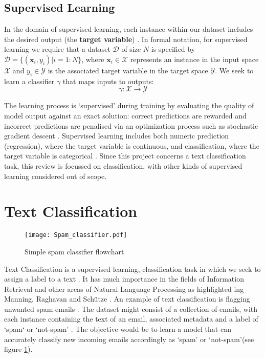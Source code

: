 \documentclass[Dissertation.tex]{subfiles}
\begin{document}
\subsection{Supervised Learning}
In the domain of supervised learning, each instance within our dataset includes the desired output (the \textbf{target variable}) \cite{geronHandsonMachineLearning2017}. In formal notation, for supervised learning we require that a dataset $ \mathcal{D}$ of size $N$ is specified by $ \mathcal{D} = \{(\mathbf{x}_i, y_i) | i = 1:N\}$, where $ \mathbf{x}_i \in \mathcal{X} $ represents an instance in the input space $ \mathcal{X} $ and $ y_i \in \mathcal{Y}$ is the associated target variable in the target space $ \mathcal{Y} $. We seek to learn a classifier $ \gamma $ that maps inputs to outputs:
$$ \gamma: \mathcal{X}\rightarrow\mathcal{Y}$$ 

The learning process is `supervised' during training by evaluating the quality of model output against an exact solution: correct predictions are rewarded and incorrect predictions are penalised via an optimization process such as stochastic gradient descent \cite{mendelsonAdvancedLecturesMachine2003}. Supervised learning includes both numeric prediction (regression), where the target variable is continuous, and classification, where the target variable is categorical \cite{wittenDataMiningPractical2011}. Since this project concerns a text classification task, this review is focussed on classification, with other kinds of supervised learning considered out of scope. 

\section{Text Classification}


\begin{figure}

	\centering
	\texttt{[image: Spam\_classifier.pdf]}
	\caption{Simple spam classifier flowchart}
	\label{spamClassifier}
\end{figure}
Text Classification is a supervised learning, classification task in which we seek to assign a label to a text \cite{jurafskySpeechLanguageProcessing}. It has much importance in the fields of Information Retrieval and other areas of Natural Language Processing  as highlighted ing Manning, Raghavan and Sch\"{u}tze \cite{manningIntroductionInformationRetrieval2009}.
An example of text classification is flagging unwanted spam emails \cite{geronHandsonMachineLearning2017}. The dataset might consist of a collection of emails, with each instance containing the text of an email, associated metadata and a label of `spam` or `not-spam' \cite{geronHandsonMachineLearning2017}. The objective would be to learn a model that can accurately classify new incoming emails accordingly as `spam' or `not-spam'(see figure \ref{spamClassifier}). 
\end{document}
